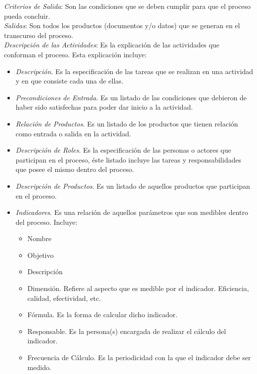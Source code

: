 \begin{footnotesize}
\textit{Criterios de Salida}: Son las condiciones que se deben cumplir para que el proceso pueda concluir.\\

\textit{Salidas}: Son todos los productos (documentos y/o datos) que se generan en el transcurso del proceso.\\

\textit{Descripción de las Actividades}: Es la explicación de las actividades que conforman el proceso. Esta explicación incluye:\\

\begin{itemize}
\item \textit{Descripción}. Es la especificación de las tareas que se realizan en una actividad y en que consiste cada una de ellas.\\ 
\item \textit{Precondiciones de Entrada}. Es un listado de las condiciones que debieron de haber sido satisfechas para poder dar inicio a la actividad.\\
\item \textit{Relación de Productos}. Es un listado de los productos que tienen relación como entrada o salida en la actividad.\\
\item \textit{Descripción de Roles}. Es la especificación de las personas o actores que participan en el proceso, éste listado incluye las tareas y responsabilidades que posee el mismo dentro del proceso.\\
\item \textit{Descripción de Productos}. Es un listado de aquellos productos que participan en el proceso.\\
\item \textit{Indicadores}. Es una relación de aquellos parámetros que son medibles dentro del proceso. Incluye:\\

	\begin{itemize}
		\item Nombre
		\item Objetivo
		\item Descripción
		\item Dimensión. Refiere al aspecto que es medible por el indicador. Eficiencia, calidad, efectividad, etc.
		\item Fórmula. Es la forma de calcular dicho indicador.
		\item Responsable. Es la persona(s) encargada de realizar el cálculo del indicador.
		\item Frecuencia de Cálculo. Es la periodicidad con la que el indicador debe ser medido.
	\end{itemize}


\end{itemize}
\end{footnotesize}

